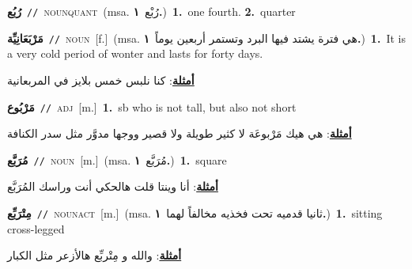 \documentclass[10pt,a4paper,twoside]{article} %
\begin{document}
\begin{multicols}{2}
{\setlength\topsep{0pt}\textbf{\foreignlanguage{arabic}{رُبُع}}\ {\color{gray}\texttt{//}\color{black}}\ \textsc{noun\textunderscore quant}\ \color{gray}(msa. \foreignlanguage{arabic}{رُبْع}~\foreignlanguage{arabic}{\textbf{١.}})\color{black}\ \textbf{1.}~one fourth.  \textbf{2.}~quarter\ } \vspace{2mm}

{\setlength\topsep{0pt}\textbf{\foreignlanguage{arabic}{مَرْبَعَانِيِّة}}\ {\color{gray}\texttt{//}\color{black}}\ \textsc{noun}\ [f.]\ \color{gray}(msa. \foreignlanguage{arabic}{هي فترة يشتد فيها البرد وتستمر أربعين يوماً}~\foreignlanguage{arabic}{\textbf{١.}})\color{black}\ \textbf{1.}~It is a very cold period of wonter and lasts for forty days.\  \begin{flushright}\color{gray}\foreignlanguage{arabic}{\textbf{\underline{\foreignlanguage{arabic}{أمثلة}}}: كنا نلبس خمس بلايز في المربعانية}\end{flushright}\color{black}} \vspace{2mm}

{\setlength\topsep{0pt}\textbf{\foreignlanguage{arabic}{مَرْبُوع}}\ {\color{gray}\texttt{//}\color{black}}\ \textsc{adj}\ [m.]\ \textbf{1.}~sb who is not tall, but also not short\  \begin{flushright}\color{gray}\foreignlanguage{arabic}{\textbf{\underline{\foreignlanguage{arabic}{أمثلة}}}: هي هيك مَرْبوعَة لا كثير طويلة ولا قصير ووجها مدوَّر مثل سدر الكنافة}\end{flushright}\color{black}} \vspace{2mm}

{\setlength\topsep{0pt}\textbf{\foreignlanguage{arabic}{مُرَبَّع}}\ {\color{gray}\texttt{//}\color{black}}\ \textsc{noun}\ [m.]\ \color{gray}(msa. \foreignlanguage{arabic}{مُرَبَّع}~\foreignlanguage{arabic}{\textbf{١.}})\color{black}\ \textbf{1.}~square\  \begin{flushright}\color{gray}\foreignlanguage{arabic}{\textbf{\underline{\foreignlanguage{arabic}{أمثلة}}}: أنا وينتا قلت هالحكي أنت وراسك المُرَبَّع}\end{flushright}\color{black}} \vspace{2mm}

{\setlength\topsep{0pt}\textbf{\foreignlanguage{arabic}{مِتْرَبِّع}}\ {\color{gray}\texttt{//}\color{black}}\ \textsc{noun\textunderscore act}\ [m.]\ \color{gray}(msa. \foreignlanguage{arabic}{ثانيا قدميه تحت فخذيه مخالفاً لهما}~\foreignlanguage{arabic}{\textbf{١.}})\color{black}\ \textbf{1.}~sitting cross-legged\  \begin{flushright}\color{gray}\foreignlanguage{arabic}{\textbf{\underline{\foreignlanguage{arabic}{أمثلة}}}: والله و مِتْربِّع هالأزعر مثل الكبار}\end{flushright}\color{black}} \vspace{2mm}


\end{multicols}
\end{document}
